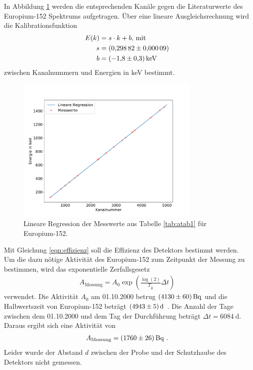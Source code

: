 In Abbildung \ref{fig:Kalibrierung} werden die entsprechenden Kanäle gegen die Literaturwerte des Europium-152 Spektrums aufgetragen.
Über eine lineare Ausgleichsrechnung wird die Kalibrationsfunktion
\begin{align*}
E(k) &= s \cdot k + b \text{, mit}\\
  s &= \SI{0.29882+-0.00009}{}\\
  b &= \SI{ -1.8+-0.3}{\kilo\electronvolt}
\end{align*}
zwischen Kanalnummern und Energien in keV bestimmt.
\begin{figure}
\centering
\includegraphics[width=0.8\textwidth]{python/plots/kalibrierung.pdf}
\caption{Lineare Regression der Messwerte aus Tabelle \ref{tab:atab1} für Europium-152.}
\label{fig:Kalibrierung}
\end{figure}
Mit Gleichung \eqref{eqn:effizienz} soll die Effizienz des Detektors bestimmt werden.
Um die dazu nötige Aktivität des Europium-152 zum Zeitpunkt der Messung zu bestimmen, wird das exponentielle Zerfallsgesetz
\begin{align}
A_\text{Messung}=A_0\exp\left(\frac{\log(2)}{T_{\frac{1}{2}}}\Delta t\right)
\end{align}
verwendet.
Die Aktivität $A_0$ am 01.10.2000 betrug $\SI{4130+-60}{\becquerel}$ und die Halbwertszeit von Europium-152 beträgt $\SI{4943+-5}{\day}$ \cite{sample}.
Die Anzahl der Tage zwischen dem 01.10.2000 und dem Tag der Durchführung beträgt $\Delta t=\SI{6084}{\day}$.
Daraus ergibt sich eine Aktivität von
\begin{align*}
A_\text{Messung}=\SI{1760+-26}{\becquerel} \text{ .}
\end{align*}
Leider wurde der Abstand $d$ zwischen der Probe und der Schutzhaube des Detektors nicht gemessen.
